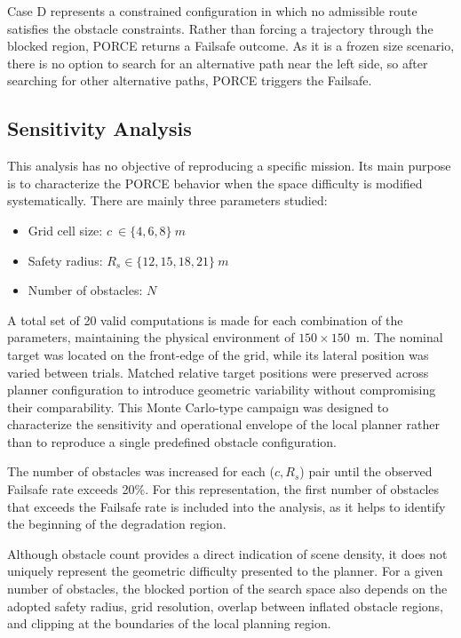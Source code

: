 \documentclass[electronics,article,submit,moreauthors]{Definitions/mdpi}
\DeclareRobustCommand{\added}[1]{#1}%
\DeclareRobustCommand{\added}[1]{\textcolor{green!50!black}{#1}}
\def\added#1{#1}%
\begin{document}
\added{Case D represents a constrained configuration in which no admissible route satisfies the obstacle constraints. Rather than forcing a trajectory through the blocked region, PORCE returns a Failsafe outcome. As it is a frozen size scenario, there is no option to search for an alternative path near the left side, so after searching for other alternative paths, PORCE triggers the Failsafe.}



{\subsection{Sensitivity Analysis}}
\added{This analysis has no objective of reproducing a specific mission. Its main purpose is to characterize the PORCE behavior when the space difficulty is modified systematically. There are mainly three parameters studied: 
\begin{itemize}
    \item Grid cell size:  $c~\in \{4,6,8\}~m$
    \item Safety radius:  $R_s \in \{12,15,18,21\}~m$
    \item Number of obstacles: $N$
\end{itemize}}

\added{A total set of 20 valid computations is made for each combination of the parameters, maintaining the physical environment of $150 \times 150$~m. The nominal target was located on the front-edge of the grid, while its lateral position was varied between trials. Matched relative target positions were preserved across planner configuration to introduce geometric variability without compromising their comparability. This Monte Carlo-type campaign was designed to characterize the sensitivity and operational envelope of the local planner rather than to reproduce a single predefined obstacle configuration.}

\added{The number of obstacles was increased for each ($c,R_s$) pair until the observed Failsafe rate exceeds 20\%. For this representation, the first number of obstacles that exceeds the Failsafe rate is included into the analysis, as it helps to identify the beginning of the degradation region.}

\added{Although obstacle count provides a direct indication of scene density, it does not uniquely represent the geometric difficulty presented to the planner. For a given number of obstacles, the blocked portion of the search space also depends on the adopted safety radius, grid resolution, overlap between inflated obstacle regions, and clipping at the boundaries of the local planning region.}
\end{document}
